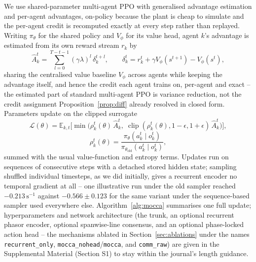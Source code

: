 \documentclass[preprint,11pt]{elsarticle}
\begin{document}
We use shared-parameter multi-agent PPO
\cite{schulman2017ppo,yu2022mappo} with generalised advantage estimation
\cite{schulman2016gae} and per-agent advantages, on-policy because the
plant is cheap to simulate and the per-agent credit is recomputed exactly
at every step rather than replayed. Writing $\pi_\theta$ for the shared
policy and $V_\phi$ for its value head, agent $k$'s advantage is estimated
from its own reward stream $r_k$ by
\begin{equation}
\hat A_k^t = \sum_{l=0}^{T-t-1} (\gamma\lambda)^l\, \delta_k^{t+l},
\qquad
\delta_k^t = r_k^t + \gamma V_\phi(s^{t+1}) - V_\phi(s^t),
\label{eq:gae}
\end{equation}
sharing the centralised value baseline $V_\phi$ across agents while keeping
the advantage itself, and hence the credit each agent trains on, per-agent
and exact -- the estimated part of standard multi-agent PPO is variance
reduction, not the credit assignment Proposition~\ref{prop:diff} already
resolved in closed form. Parameters update on the clipped surrogate
\begin{equation}
\mathcal{L}(\theta) = \mathbb{E}_{k,t}\Big[
\min\big(\rho_k^t(\theta)\, \hat A_k^t,\;
\operatorname{clip}(\rho_k^t(\theta), 1{-}\epsilon, 1{+}\epsilon)\, \hat A_k^t\big)
\Big],
\label{eq:ppo}
\end{equation}
\begin{equation}
\rho_k^t(\theta) = \frac{\pi_\theta(a_k^t \mid o_k^t)}{\pi_{\theta_{\mathrm{old}}}(a_k^t \mid o_k^t)},
\label{eq:ppo-ratio}
\end{equation}
summed with the usual value-function and entropy terms. Updates run on
sequences of consecutive steps with a detached stored hidden state; sampling
shuffled individual timesteps, as we did initially, gives a recurrent
encoder no temporal gradient at all \cite{hausknecht2015drqn} -- one
illustrative run under the old sampler reached $-0.213\,\mathrm{s}^{-1}$
against $-0.566\pm0.123$ for the same variant under the sequence-based
sampler used everywhere else. Algorithm~\ref{alg:mocca} summarises one
full update; hyperparameters and network architecture (the trunk, an
optional recurrent phasor encoder, optional spanwise-line consensus, and
an optional phase-locked action head -- the mechanisms ablated in
Section~\ref{sec:ablations} under the names \texttt{recurrent\_only},
\texttt{mocca\_nohead}/\texttt{mocca}, and \texttt{comm\_raw}) are given in
the Supplemental Material (Section S1) to stay within the journal's
length guidance.
\end{document}
